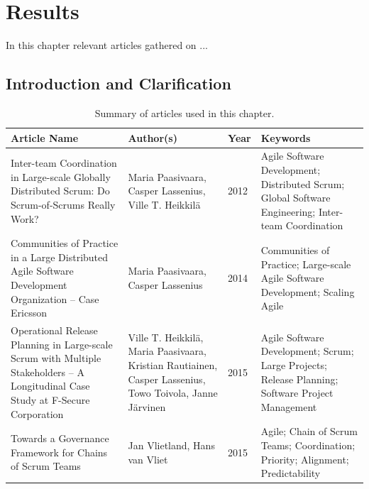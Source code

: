 \chapter{Results}
\label{results}

\minitoc

In this chapter relevant articles gathered on ...

\newpage

\section{Introduction and Clarification}

\begin{table}[H]
\begin{center}
    \begin{tabular}{| p{5cm} | p{3.7cm} | p{1cm} | p{4cm} |}
    \hline
    \textbf{Article Name} & \textbf{Author(s)} & \textbf{Year} & \textbf{Keywords} \\ \hline
    Inter-team Coordination in Large-scale Globally Distributed Scrum: Do Scrum-of-Scrums Really Work? & Maria Paasivaara, Casper Lassenius, Ville T. Heikkilä & 2012 & Agile Software Development; Distributed Scrum; Global Software Engineering; Inter-team Coordination \\ \hline
    Communities of Practice in a Large Distributed Agile Software Development Organization – Case Ericsson & Maria Paasivaara, Casper Lassenius & 2014 & Communities of Practice; Large-scale Agile Software Development; Scaling Agile \\ \hline
    Operational Release Planning in Large-scale Scrum with Multiple Stakeholders – A Longitudinal Case Study at F-Secure Corporation & Ville T. Heikkilä, Maria Paasivaara, Kristian Rautiainen, Casper Lassenius, Towo Toivola, Janne Järvinen & 2015 & Agile Software Development; Scrum; Large Projects; Release Planning; Software Project Management \\ \hline
Towards a Governance Framework for Chains of Scrum Teams & Jan Vlietland, Hans van Vliet & 2015 & Agile; Chain of Scrum Teams; Coordination; Priority; Alignment; Predictability \\ \hline
    \end{tabular}
    \caption{Summary of articles used in this chapter.}
    \label{soauitc}
\end{center}
\end{table}

